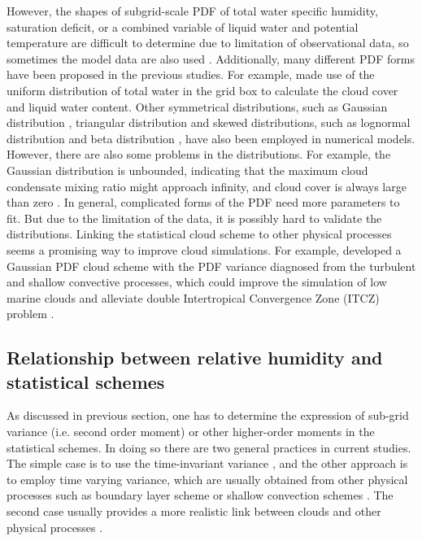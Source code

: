 However, the shapes of subgrid-scale PDF of total water specific humidity, saturation deficit, or a combined variable of liquid water and potential temperature are difficult to determine due to limitation of observational data, so sometimes the model data are also used \citep{Bony2001}. Additionally, many different PDF forms have been proposed in the previous studies. For example, \cite{LeTreut1991} made use of the uniform distribution of total water in the grid box to calculate the cloud cover and liquid water content. Other symmetrical distributions, such as Gaussian distribution \citep{Sommeria1977}, triangular distribution \citep{Smith1990} and skewed distributions, such as lognormal distribution \citep{Bony2001} and beta distribution \citep{Tompkins2002}, have also been employed in numerical models. However, there are also some problems in the distributions. For example, the Gaussian distribution is unbounded, indicating that the maximum cloud condensate mixing ratio might approach infinity, and cloud cover is always large than zero \citep{Tompkins2002}. In general, complicated forms of the PDF need more parameters to fit. But due to the limitation of the data, it is possibly hard to validate the distributions. Linking the statistical cloud scheme to other physical processes seems a promising way to improve cloud simulations. For example, \cite{Qin2018} developed a Gaussian PDF cloud scheme with the PDF variance diagnosed from the turbulent
and shallow convective processes, which could improve the simulation of low marine clouds and alleviate double Intertropical Convergence Zone (ITCZ) problem \citep{Qin2018alleviated}.


\subsection{Relationship between relative humidity and statistical schemes}

As discussed in previous section, one has to determine the expression of sub-grid variance (i.e. second order moment) or other higher-order moments in the statistical schemes. In doing so there are two general practices in current studies. The simple case is to use the time-invariant variance \citep[e.g.,][]{Sundqvist1978,Smith1990}, and the other approach is to employ time varying variance, which are usually obtained from other physical processes such as boundary layer scheme or shallow convection schemes \citep[e.g.,][]{Qin2018}. The second case usually provides a more realistic link between clouds and other physical processes \citep{Tompkins2002}. 

